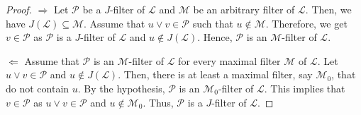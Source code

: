 \documentclass[preprint,review,10pt]{amsart}
\theoremstyle{definition}
\theoremstyle{remark}
\numberwithin{equation}{section}
\begin{document}
\begin{proof}
$\Longrightarrow$ Let $\mathcal{P}$ be a  $J$-filter of $\mathcal{L}$ and $\mathcal{M}$ be an arbitrary filter of $\mathcal{L}$. Then,   we have $J(\mathcal{L}) \subseteq \mathcal{M}$. Assume that $u \vee v \in \mathcal{P}$ such that $ u \notin \mathcal{M}$. Therefore, we get  $v \in  \mathcal{P}$ as $\mathcal{P}$ is a  $J$-filter of $\mathcal{L}$ and $u \notin  J(\mathcal{L})$. Hence, $\mathcal{P}$ is an  $\mathcal{M}$-filter of $\mathcal{L}$.

$\Longleftarrow$ Assume that $\mathcal{P}$ is an  $\mathcal{M}$-filter of $\mathcal{L}$ for every maximal filter $\mathcal{M}$ of $\mathcal{L}$. Let $u \vee v \in \mathcal{P}$ and $u \notin J(\mathcal{L})$. Then, there is at least a maximal  filter, say $\mathcal{M}_0$,  that do not contain $u$.  By the hypothesis, $\mathcal{P}$ is an  $\mathcal{M}_0$-filter of $\mathcal{L}$. This implies that   $v \in \mathcal{P}$ as $u \vee v \in \mathcal{P}$ and $u \notin \mathcal{M}_0$. Thus, $\mathcal{P}$ is a  $J$-filter of $\mathcal{L}$.
\end{proof}
\end{document}
